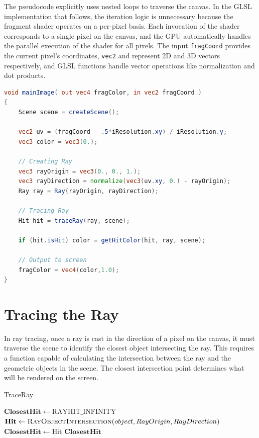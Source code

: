 The pseudocode explicitly uses nested loops to traverse the canvas. In the GLSL implementation that follows, the iteration logic is unnecessary because the fragment shader operates on a per-pixel basis. Each invocation of the shader corresponds to a single pixel on the canvas, and the GPU automatically handles the parallel execution of the shader for all pixels. The input \texttt{fragCoord} provides the current pixel's coordinates, \texttt{vec2} and  represent 2D and 3D vectors respectively, and GLSL functions handle vector operations like normalization and dot products. 


\begin{lstlisting}[language=GLSL, caption={Code 1: Canvas Traversal}, label={lst:CanvasTraversal} float=H]
void mainImage( out vec4 fragColor, in vec2 fragCoord )
{
    Scene scene = createScene();

    vec2 uv = (fragCoord - .5*iResolution.xy) / iResolution.y;
    vec3 color = vec3(0.);
    
    // Creating Ray
    vec3 rayOrigin = vec3(0., 0., 1.);
    vec3 rayDirection = normalize(vec3(uv.xy, 0.) - rayOrigin);
    Ray ray = Ray(rayOrigin, rayDirection);
    
    // Tracing Ray
    Hit hit = traceRay(ray, scene);
    
    if (hit.isHit) color = getHitColor(hit, ray, scene);
    
    // Output to screen
    fragColor = vec4(color,1.0);
}
\end{lstlisting}

\section{Tracing the Ray}

In ray tracing, once a ray is cast in the direction of a pixel on the canvas, it must traverse the scene to identify the closest object intersecting the ray. This requires a function capable of calculating the intersection between the ray and the geometric objects in the scene. The closest intersection point determines what will be rendered on the screen.


\begin{algorithm}[H]
\caption{TraceRay}
\begin{algorithmic}[1]
    \State $ \mathbf{ClosestHit} \gets \text{RAYHIT\_INFINITY} $
        \State $\mathbf{Hit} \gets \Call{RayObjectIntersection}{object, RayOrigin, RayDirection}$
            \State $\mathbf{ClosestHit} \gets \text{Hit}$
        \EndIf
    \EndFor
    \State \Return $\mathbf{ClosestHit}$
\EndProcedure
\end{algorithmic}
\end{algorithm}


